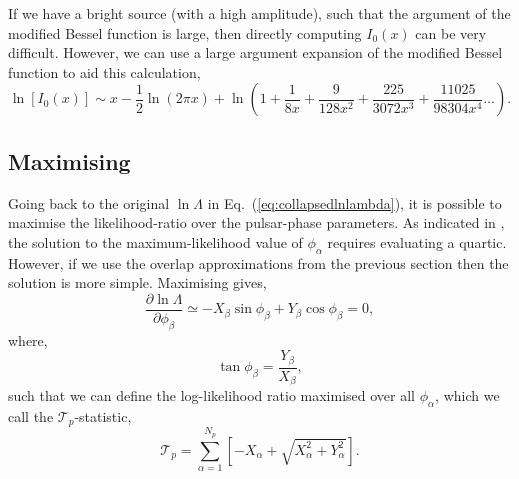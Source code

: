 \documentclass[twocolappendix,tighten]{emulateapj}
\begin{document}
If we have a bright source (with a high amplitude), such that the argument of the modified Bessel function is large, then directly computing $I_0(x)$ can be very difficult. However, we can use a large argument expansion of the modified Bessel function to aid this calculation,
\begin{equation}
 \ln\left[I_0(x)\right] \sim x-\frac{1}{2}\ln\left(2\pi x\right) + \ln\left(1+\frac{1}{8x}+\frac{9}{128x^2}+\frac{225}{3072x^3}+\frac{11025}{98304x^4}\ldots\right).
\end{equation}







\subsection{Maximising}

Going back to the original $\ln\Lambda$ in Eq.\ (\ref{eq:collapsedlnlambda}), it is possible to maximise the likelihood-ratio over the pulsar-phase parameters. As indicated in \citet{ellisoptimal2012}, the solution to the maximum-likelihood value of $\phi
_{\alpha}$ requires evaluating a quartic. However, if we use the overlap approximations from the previous section then the solution is more simple. Maximising gives,
\begin{equation}
\frac{\partial\ln\Lambda}{\partial\phi_{\beta}} \simeq -X_{\beta}\sin\phi_{\beta} + Y_{\beta}\cos\phi_{\beta}=0,
\end{equation}
where,
\begin{equation}
\tan\phi_{\beta}=\frac{Y_{\beta}}{X_{\beta}},
\end{equation}
such that we can define the log-likelihood ratio maximised over all $\phi_{\alpha}$, which we call the $\mathcal{T}_p$-statistic,
\begin{equation}
\mathcal{T}_p = \sum_{\alpha=1}^{N_p}\left[-X_{\alpha} + \sqrt{X_{\alpha}^2+Y_{\alpha}^2}\right].
\end{equation}
\end{document}
